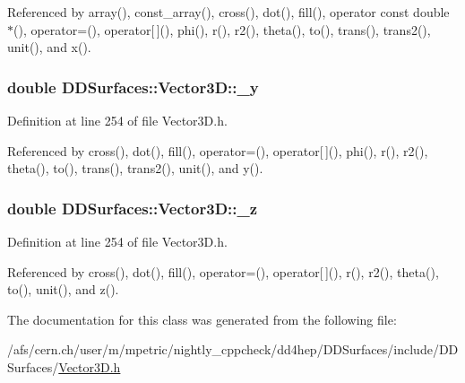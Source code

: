 Referenced by array(), const\_\-array(), cross(), dot(), fill(), operator const double $\ast$(), operator=(), operator\mbox{[}$\,$\mbox{]}(), phi(), r(), r2(), theta(), to(), trans(), trans2(), unit(), and x().\hypertarget{class_d_d_surfaces_1_1_vector3_d_a69ad9a281ca55cd4b1e9959265855a97}{
\subsubsection[{\_\-y}]{\setlength{\rightskip}{0pt plus 5cm}double {\bf DDSurfaces::Vector3D::\_\-y}}}
\label{class_d_d_surfaces_1_1_vector3_d_a69ad9a281ca55cd4b1e9959265855a97}


Definition at line 254 of file Vector3D.h.

Referenced by cross(), dot(), fill(), operator=(), operator\mbox{[}$\,$\mbox{]}(), phi(), r(), r2(), theta(), to(), trans(), trans2(), unit(), and y().\hypertarget{class_d_d_surfaces_1_1_vector3_d_a8cfed9e9ca399b20c9b4d3bbb5692bc9}{
\subsubsection[{\_\-z}]{\setlength{\rightskip}{0pt plus 5cm}double {\bf DDSurfaces::Vector3D::\_\-z}}}
\label{class_d_d_surfaces_1_1_vector3_d_a8cfed9e9ca399b20c9b4d3bbb5692bc9}


Definition at line 254 of file Vector3D.h.

Referenced by cross(), dot(), fill(), operator=(), operator\mbox{[}$\,$\mbox{]}(), r(), r2(), theta(), to(), unit(), and z().

The documentation for this class was generated from the following file:\begin{DoxyCompactItemize}
\item 
/afs/cern.ch/user/m/mpetric/nightly\_\-cppcheck/dd4hep/DDSurfaces/include/DDSurfaces/\hyperlink{_vector3_d_8h}{Vector3D.h}\end{DoxyCompactItemize}
